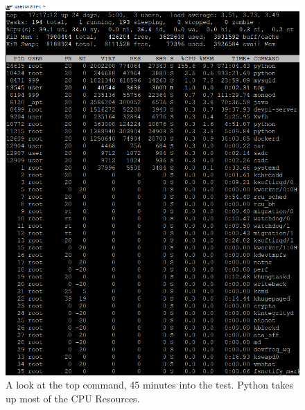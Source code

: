 \documentclass[12pt]{article}
\begin{document}
\begin{figure}[h!]
	\centering
	\includegraphics[width=\textwidth,height=\textheight,keepaspectratio]{intro/S3_harshit.png}
	\caption{A look at the top command, 45 minutes into the test. Python takes up most of the CPU Resources.}
\end{figure}
\end{document}
